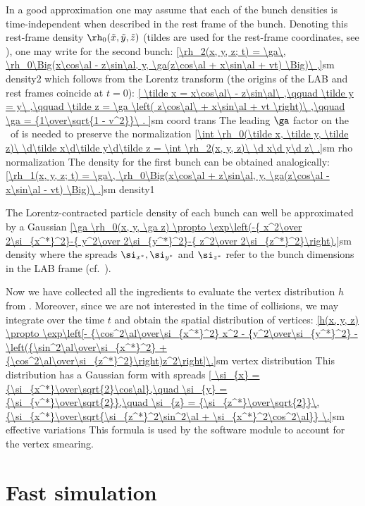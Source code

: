 In a good approximation one may assume that each of the bunch densities is time-independent when described in the rest frame of the bunch. Denoting this rest-frame density $\rh_0(\tilde x, \tilde y, \tilde z)$ (tildes are used for the rest-frame coordinates, see ), one may write for the second bunch:
\eqref{\rh_2(x, y, z; t) = \ga\, \rh_0\Big(x\cos\al - z\sin\al, y, \ga(z\cos\al + x\sin\al + vt) \Big)\ ,}{sm density2}
which follows from the Lorentz transform (the origins of the LAB and rest frames coincide at $t=0$):
\eqref{
	\tilde x = x\cos\al\ - z\sin\al\ ,\qquad
	\tilde y = y\ ,\qquad
	\tilde z = \ga \left( z\cos\al\ + x\sin\al + vt \right)\ ,\qquad
	\ga = {1\over\sqrt{1 - v^2}}\ .
}{sm coord trans}
The leading $\ga$ factor on the \rhs~of  is needed to preserve the normalization
\eqref{\int \rh_0(\tilde x, \tilde y, \tilde z)\ \d\tilde x\d\tilde y\d\tilde z = \int \rh_2(x, y, z)\ \d x\d y\d z\ .}{sm rho normalization}
The density for the first bunch can be obtained analogically:
\eqref{\rh_1(x, y, z; t) = \ga\, \rh_0\Big(x\cos\al + z\sin\al, y, \ga(z\cos\al - x\sin\al - vt) \Big)\ .}{sm density1}

The Lorentz-contracted particle density of each bunch can well be approximated by a Gaussian 
\eqref{\ga \rh_0(x, y, \ga z) \propto \exp\left(-{ x^2\over 2\si_{x^*}^2}-{ y^2\over 2\si_{y^*}^2}-{ z^2\over 2\si_{z^*}^2}\right),}{sm density}
where the spreads $\si_{x^*}, \si_{y^*}$ and $\si_{z^*}$ refer to the bunch dimensions in the LAB frame (cf.~).

Now we have collected all the ingredients to evaluate the vertex distribution $h$ from . Moreover, since we are not interested in the time of collisions, we may integrate over the time $t$ and obtain the spatial distribution of vertices:
\eqref{h(x, y, z) \propto \exp\left[- {\cos^2\al\over\si_{x^*}^2} x^2 - {y^2\over\si_{y^*}^2} - \left({\sin^2\al\over\si_{x^*}^2} + {\cos^2\al\over\si_{z^*}^2}\right)z^2\right]\.}{sm vertex distribution}
This distribution has a Gaussian form with spreads
\eqref{
	\si_{x} = {\si_{x^*}\over\sqrt{2}\cos\al},\quad
	\si_{y} = {\si_{y^*}\over\sqrt{2}},\quad
	\si_{z} = {\si_{z^*}\over\sqrt{2}}\,{\si_{x^*}\over\sqrt{\si_{z^*}^2\sin^2\al + \si_{x^*}^2\cos^2\al}} \.}{sm effective variations}
This formula is used by the software module to account for the vertex smearing.


\section[fast simu]{Fast simulation}


